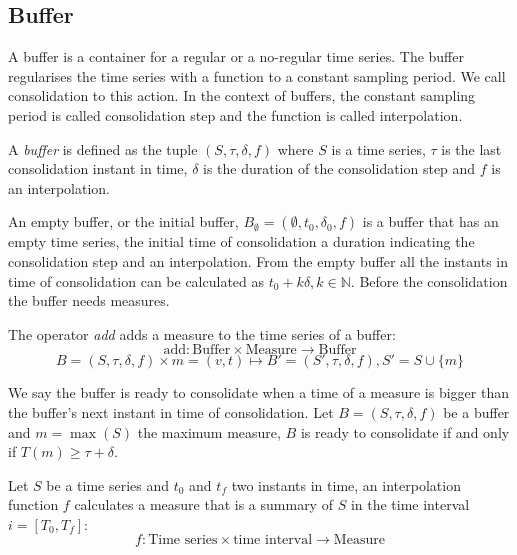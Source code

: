 \subsection{Buffer}\label{sec:model:buffer}

A buffer is a container for a regular or a no-regular time series. The
buffer regularises the time series with a function to a constant
sampling period. We call consolidation to this action. In the context
of buffers, the constant sampling period is called consolidation step
and the function is called interpolation.

\begin{definition}[Buffer]
  A \emph{buffer} is defined as the tuple $(S,\tau,\delta,f)$ where
  $S$ is a time series, $\tau$ is the last consolidation instant in
  time, $\delta$ is the duration of the consolidation step and $f$ is
  an interpolation.
\end{definition}

An empty buffer, or the initial buffer, $B_{\emptyset} =
(\emptyset,t_0, \delta_0, f)$ is a buffer that has an empty time
series, the initial time of consolidation a duration indicating the
consolidation step and an interpolation. From the empty buffer all the
instants in time of consolidation can be calculated as $t_0+k\delta,
k\in\mathbb{N}$. Before the consolidation the buffer needs measures.

\begin{definition}
  The operator \emph{add} adds a measure to the time series of a buffer:
  \[
  \text{add}: \text{Buffer} \times \text{Measure} \longrightarrow \text{Buffer}
  \]
  \[
   B = (S,\tau,\delta,f)  \times m = (v,t) \mapsto B'= (S',\tau,\delta,f),
   S' = S \cup \{m\}
   \] 
\end{definition}

\begin{definition}
  We say the buffer is ready to consolidate when a time of a measure
  is bigger than the buffer's next instant in time of consolidation.
  Let $B=(S,\tau,\delta,f)$ be a buffer and $m=\max(S)$ the maximum
  measure, $B$ is ready to consolidate if and only if $T(m) \geq
  \tau+\delta$.
\end{definition}

Let $S$ be a time series and $t_0$ and $t_f$ two instants in time, an
interpolation function $f$ calculates a measure that is a summary of
$S$ in the time interval $i=[T_0,T_f]$:
\[
f: \text{Time series} \times \text{time interval} \longrightarrow
\text{Measure}
\]


